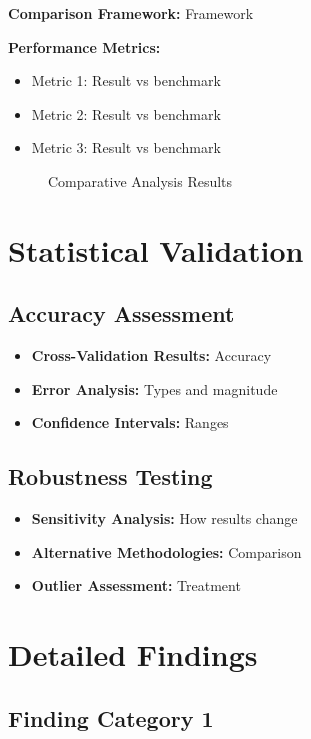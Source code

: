 \documentclass[11pt,letterpaper]{article}
\begin{document}
\textbf{Comparison Framework:} Framework

\textbf{Performance Metrics:}
\begin{itemize}
    \item Metric 1: Result vs benchmark
    \item Metric 2: Result vs benchmark
    \item Metric 3: Result vs benchmark
\end{itemize}

\begin{figure}
    \centering
    \caption{Comparative Analysis Results}
    \label{fig:comparison}
\end{figure}

\section{Statistical Validation}

\subsection{Accuracy Assessment}
\begin{itemize}
    \item \textbf{Cross-Validation Results:} Accuracy
    \item \textbf{Error Analysis:} Types and magnitude
    \item \textbf{Confidence Intervals:} Ranges
\end{itemize}

\subsection{Robustness Testing}
\begin{itemize}
    \item \textbf{Sensitivity Analysis:} How results change
    \item \textbf{Alternative Methodologies:} Comparison
    \item \textbf{Outlier Assessment:} Treatment
\end{itemize}

\section{Detailed Findings}

\subsection{Finding Category 1}
\end{document}

